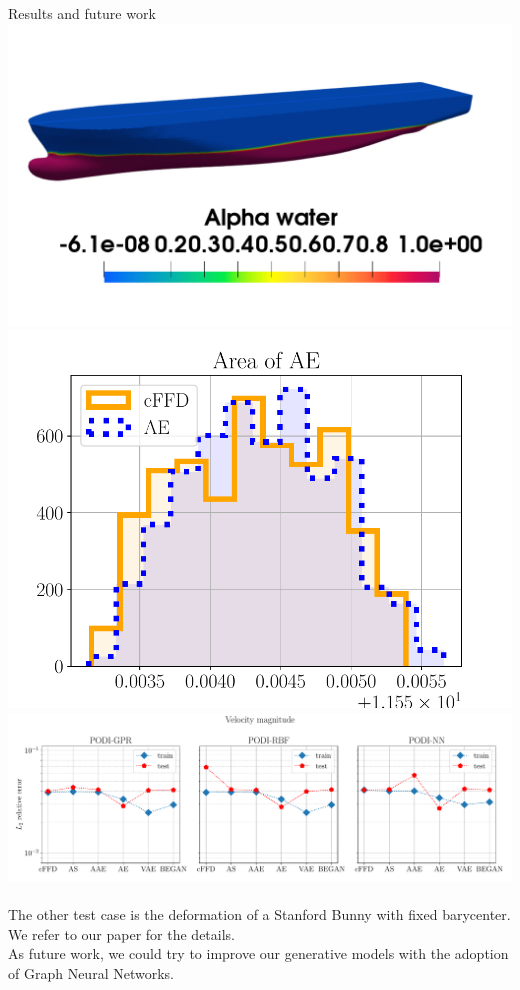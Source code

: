 \documentclass[b0paper,portrait]{baposter}
\begin{document}
\begin{poster}
\begin{posterbox}[name=results,below=vae,span=6,column=0]{Results and future work}
\includegraphics[scale=0.20]{DTCHull_alpha} \quad      \quad     \includegraphics[scale=0.35]{images_Area_hist_AE}   \quad \quad     \includegraphics[scale=0.35]{images_DTCHull_u_rom}\\
\hfill\\
The other test case is the deformation of a Stanford Bunny with fixed barycenter. We refer to our paper for the details.\\
As future work, we could try to improve our generative models with the adoption of Graph Neural Networks.

\end{posterbox}
\end{poster}
\end{document}
